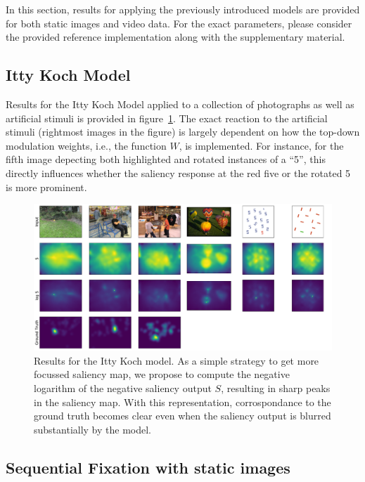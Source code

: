 \documentclass[a4paper,twocolumn,10pt]{article}
\begin{document}
In this section, results for applying the previously introduced models are provided for both static images and video data.
For the exact parameters, please consider the provided reference implementation along with the supplementary material.

\subsection{Itty Koch Model}

Results for the Itty Koch Model applied to a collection of photographs as well as artificial stimuli is provided in figure~\ref{fig:ittykoch}.
The exact reaction to the artificial stimuli (rightmost images in the figure) is largely dependent on how the top-down modulation weights, i.e., the function $W$, is implemented.
For instance, for the fifth image depecting both highlighted and rotated instances of a ``5'', this directly influences whether the saliency response at the red five or the rotated 5 is more prominent.

\begin{figure}[htp]
  \centering
  \includegraphics[width=\textwidth]{fig/output.pdf}
  \caption{\small
  Results for the Itty Koch \cite{Itty2000} model.
  As a simple strategy to get more focussed saliency map, we propose to compute the negative logarithm of the negative saliency output $S$, resulting in sharp peaks in the saliency map.
  With this representation, corrospondance to the ground truth becomes clear even when the saliency output is blurred substantially by the model.
  }
  \label{fig:ittykoch}
\end{figure}

\subsection{Sequential Fixation with static images}
\end{document}
